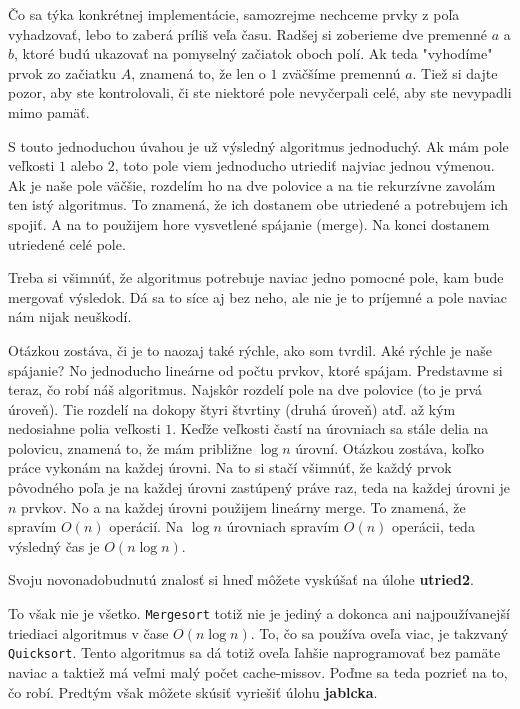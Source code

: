 
Čo sa týka konkrétnej implementácie, samozrejme nechceme prvky z poľa vyhadzovať, lebo to zaberá
príliš veľa času. Radšej si zoberieme dve premenné $a$ a $b$, ktoré budú ukazovať na pomyselný
začiatok oboch polí. Ak teda "vyhodíme" prvok zo začiatku $A$, znamená to, že len o $1$ zväčšíme
premennú $a$. Tiež si dajte pozor, aby ste kontrolovali, či ste niektoré pole nevyčerpali celé, aby
ste nevypadli mimo pamäť.

S touto jednoduchou úvahou je už výsledný algoritmus jednoduchý. Ak mám pole veľkosti $1$ alebo $2$,
toto pole viem jednoducho utriediť najviac jednou výmenou. Ak je naše pole väčšie, rozdelím ho na
dve polovice a na tie rekurzívne zavolám ten istý algoritmus. To znamená, že ich dostanem obe
utriedené a potrebujem ich spojiť. A na to použijem hore vysvetlené spájanie (merge). Na konci
dostanem utriedené celé pole.

Treba si všimnúť, že algoritmus potrebuje naviac jedno pomocné pole, kam bude mergovať výsledok. Dá
sa to síce aj bez neho, ale nie je to príjemné a pole naviac nám nijak neuškodí.

Otázkou zostáva, či je to naozaj také rýchle, ako som tvrdil. Aké rýchle je naše spájanie? No
jednoducho lineárne od počtu prvkov, ktoré spájam. Predstavme si teraz, čo robí náš algoritmus.
Najskôr rozdelí pole na dve polovice (to je prvá úroveň). Tie rozdelí na dokopy štyri štvrtiny
(druhá úroveň) atď. až kým nedosiahne polia veľkosti $1$. Keďže veľkosti častí na úrovniach sa stále
delia na polovicu, znamená to, že mám približne $\log n$ úrovní. Otázkou zostáva, koľko práce
vykonám na každej úrovni. Na to si stačí všimnúť, že každý prvok pôvodného poľa je na každej úrovni
zastúpený práve raz, teda na každej úrovni je $n$ prvkov. No a na každej úrovni použijem lineárny
merge. To znamená, že spravím $O(n)$ operácií. Na $\log n$ úrovniach spravím $O(n)$ operácii, teda
výsledný čas je $O(n \log n)$.

\medskip

Svoju novonadobudnutú znalosť si hneď môžete vyskúšať na úlohe \textbf{utried2}.

\medskip

To však nie je všetko. \texttt{Mergesort} totiž nie je jediný a dokonca ani najpoužívanejší
triediaci algoritmus v čase $O(n \log n)$. To, čo sa používa oveľa viac, je takzvaný
\texttt{Quicksort}. Tento algoritmus sa dá totiž oveľa ľahšie naprogramovať bez pamäte naviac a
taktiež má veľmi malý počet cache-missov. Poďme sa teda pozrieť na to, čo robí. Predtým však môžete
skúsiť vyriešiť úlohu \textbf{jablcka}.

